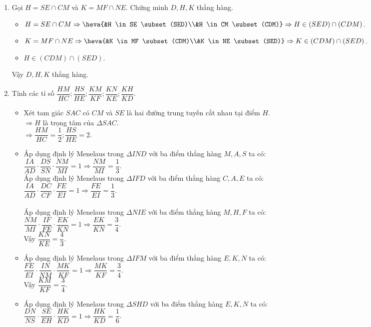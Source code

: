 \begin{bt}
\begin{bt}
{\begin{enumerate}
			
			
			
			\item Gọi $H=SE \cap CM$ và $K=MF \cap NE$. Chứng minh $D, H, K$ thẳng hàng.
			\begin{itemize}
				\item $H=SE \cap CM \Rightarrow \heva{&H \in SE \subset (SED)\\&H \in CM \subset (CDM)} \Rightarrow H \in (SED) \cap (CDM)$.
				\item $K = MF \cap NE \Rightarrow \heva{&K \in MF \subset (CDM)\\&K \in NE \subset (SED)} \Rightarrow K \in (CDM) \cap (SED)$.
				\item $H \in (CDM) \cap (SED)$.	
			\end{itemize}
			Vậy $D, H, K$ thẳng hàng.
			\item Tính các tỉ số $\dfrac{HM}{HC}; \dfrac{HS}{HE}; \dfrac{KM}{KF}; \dfrac{KN}{KE}; \dfrac{KH}{KD}$.
			\begin{itemize}
				\item Xét tam giác $SAC$ có $CM$ và $SE$ là hai đường trung tuyến cắt nhau tại điểm $H$.\\
				$ \Rightarrow H$ là trọng tâm của $\Delta SAC$.\\
				$\Rightarrow \dfrac{HM}{HC}=\dfrac{1}{2}; \dfrac{HS}{HE}=2$.
				\item Áp dụng định lý Menelaus trong $\Delta IND$ với ba điểm thẳng hàng $M, A, S$ ta có$\colon$\\$\dfrac{IA}{AD}\cdot \dfrac{DS}{SN}\cdot \dfrac{NM}{MI}=1 \Rightarrow \dfrac{NM}{MI}=\dfrac{1}{3}$.\\
				Áp dụng định lý Menelaus trong $\Delta IFD$ với ba điểm thẳng hàng $C, A, E$ ta có$\colon$\\$\dfrac{IA}{AD}\cdot \dfrac{DC}{CF}\cdot \dfrac{FE}{EI}=1 \Rightarrow \dfrac{FE}{EI}=\dfrac{1}{3}$.\\
				\\Áp dụng định lý Menelaus trong $\Delta NIE$ với ba điểm thẳng hàng $M, H, F$ ta có$\colon$\\$\dfrac{NM}{MI}\cdot \dfrac{IF}{FE}\cdot \dfrac{EK}{KN}=1 \Rightarrow \dfrac{EK}{KN}=\dfrac{3}{4}$.\\
				Vậy $\dfrac{KN}{KE}=\dfrac{4}{3}$.
				\item 
				Áp dụng định lý Menelaus trong $\Delta IFM$ với ba điểm thẳng hàng $E, K, N$ ta có$\colon$\\$\dfrac{FE}{EI}\cdot \dfrac{IN}{NM}\cdot \dfrac{MK}{KF}=1 \Rightarrow \dfrac{MK}{KF}=\dfrac{3}{4}$.\\
				Vậy $\dfrac{KM}{KF}=\dfrac{3}{4}$.
				\item Áp dụng định lý Menelaus trong $\Delta SHD$ với ba điểm thẳng hàng $E, K, N$ ta có$\colon$\\$\dfrac{DN}{NS}\cdot \dfrac{SE}{EH}\cdot \dfrac{HK}{KD}=1 \Rightarrow \dfrac{HK}{KD}=\dfrac{1}{6}$.\\
			\end{itemize}
		\end{enumerate}
		
}
\end{bt}
\end{bt}
